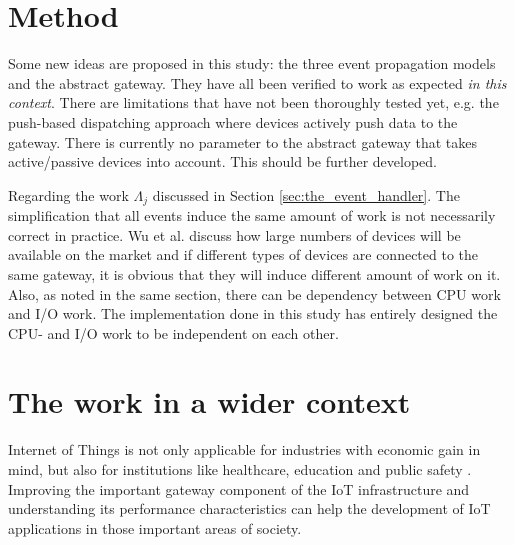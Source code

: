 \section{Method}
\label{sec:discussion-method}

Some new ideas are proposed in this study: the three event propagation models
and the abstract gateway. They have all been verified to work as expected
\textit{in this context}. There are limitations that have not been thoroughly
tested yet, e.g. the push-based dispatching approach where devices actively
push data to the gateway. There is currently no parameter to the abstract
gateway that takes active/passive devices into account. This should be further
developed.

Regarding the work $\Lambda_j$ discussed in Section
\ref{sec:the_event_handler}. The simplification that all events induce the same
amount of work is not necessarily correct in practice. Wu et al.
\cite{wu2011m2m} discuss how large numbers of devices will be available on the
market and if different types of devices are connected to the same gateway, it
is obvious that they will induce different amount of work on it. Also, as noted
in the same section, there can be dependency between CPU work and I/O work. The
implementation done in this study has entirely designed the CPU- and I/O work
to be independent on each other.

\section{The work in a wider context}
\label{sec:work-wider-context}

Internet of Things is not only applicable for industries with economic gain in
mind, but also for institutions like healthcare, education and public safety
\cite{gubbi2013internet}. Improving the important gateway component of the IoT
infrastructure and understanding its performance characteristics can help the
development of IoT applications in those important areas of society.
